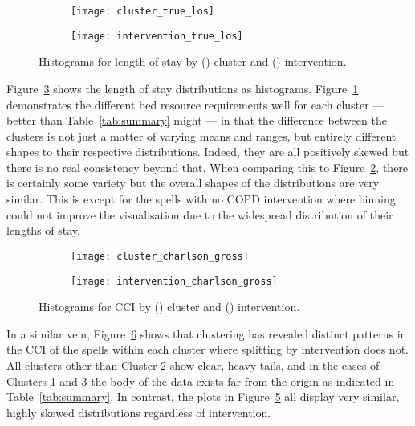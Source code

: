 \begin{figure}
    \centering
    \begin{subfigure}{\halfimgwidth}
        \texttt{[image: cluster\_true\_los]}
        \caption{}\label{fig:cluster_los}
    \end{subfigure}\hfill%
    \begin{subfigure}{\halfimgwidth}
        \texttt{[image: intervention\_true\_los]}
        \caption{}\label{fig:intervention_los}
    \end{subfigure}
    \caption{%
        Histograms for length of stay by () cluster and
        () intervention.
    }\label{fig:los}
\end{figure}

Figure~\ref{fig:los} shows the length of stay distributions as histograms.
Figure~\ref{fig:cluster_los} demonstrates the different bed resource
requirements well for each cluster --- better than Table~\ref{tab:summary}
might --- in that the difference between the clusters is not just a matter of
varying means and ranges, but entirely different shapes to their respective
distributions. Indeed, they are all positively skewed but there is no real
consistency beyond that. When comparing this to
Figure~\ref{fig:intervention_los}, there is certainly some variety but the
overall shapes of the distributions are very similar. This is except for the
spells with no COPD intervention where binning could not improve the
visualisation due to the widespread distribution of their lengths of stay.

\begin{figure}
    \centering
    \begin{subfigure}{\halfimgwidth}
        \texttt{[image: cluster\_charlson\_gross]}
        \caption{}\label{fig:cluster_charlson}
    \end{subfigure}\hfill%
    \begin{subfigure}{\halfimgwidth}
        \texttt{[image: intervention\_charlson\_gross]}
        \caption{}\label{fig:intervention_charlson}
    \end{subfigure}
    \caption{%
        Histograms for CCI by () cluster and
        () intervention.
    }\label{fig:charlson}
\end{figure}

In a similar vein, Figure~\ref{fig:charlson} shows that clustering has revealed
distinct patterns in the CCI of the spells within each cluster where splitting
by intervention does not. All clusters other than Cluster 2 show clear, heavy
tails, and in the cases of Clusters 1 and 3 the body of the data exists far from
the origin as indicated in Table~\ref{tab:summary}. In contrast, the plots in
Figure~\ref{fig:intervention_charlson} all display very similar, highly skewed
distributions regardless of intervention.

